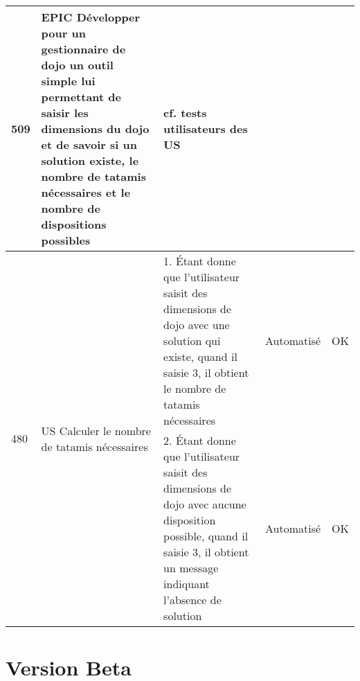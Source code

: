 \begin{adjustwidth}{-1.5cm}{0cm}
{\begin{tabular}{|m{0.6cm}|m{5.5cm}|m{8cm}|m{2cm}|c|}
            509                                                                                                      & EPIC Développer pour un gestionnaire de dojo un outil simple lui permettant de saisir les dimensions du dojo et
            de savoir si un solution existe, le nombre de tatamis nécessaires et le nombre de dispositions possibles & \cellcolor{tsyellow} cf. tests utilisateurs des US                                                                                     &                                                                                                                                                                                    &                            \\ \hline
            \multirow{2}{0.6cm}{480}                                                                                 & \multirow{2}{5.5cm}{US Calculer le nombre de tatamis nécessaires}                                                                      & 1. Étant donne que l'utilisateur saisit des dimensions de dojo avec une solution qui existe, quand il saisie 3, il obtient le nombre de tatamis nécessaires                        & Automatisé      & OK       \\ \cline{3-5}
                                                                                                                     &                                                                                                                                        & 2. Étant donne que l'utilisateur saisit des dimensions de dojo avec aucune disposition possible, quand il saisie 3, il obtient un message indiquant l'absence de solution          & Automatisé      & OK       \\ \hline
        \end{tabular}}
\end{adjustwidth}


\section{Version Beta}


